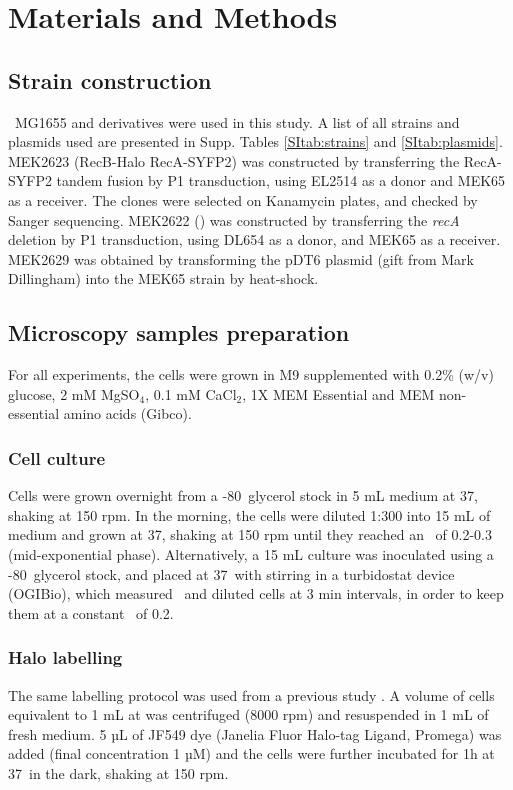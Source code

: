\section*{Materials and Methods}

\subsection*{Strain construction}
\ecoli\ MG1655 and derivatives were used in this study. A list of all strains and plasmids used are presented in Supp. Tables \ref{SItab:strains} and \ref{SItab:plasmids}.
MEK2623 (RecB-Halo RecA-SYFP2) was constructed by transferring the RecA-SYFP2 tandem fusion by P1 transduction, using EL2514 \cite{Wiktor2021} as a donor and MEK65 \cite{Lepore2019a} as a receiver. The clones were selected on Kanamycin plates, and checked by Sanger sequencing. MEK2622 (\dreca) was constructed by transferring the \emph{recA} deletion by P1 transduction, using DL654 as a donor, and MEK65 as a receiver. MEK2629 was obtained by transforming the pDT6 plasmid (gift from Mark Dillingham) into the MEK65 strain by heat-shock.

\subsection*{Microscopy samples preparation}
For all experiments, the cells were grown in M9 supplemented with 0.2\% (w/v) glucose, 2 mM MgSO$_4$, 0.1 mM CaCl$_2$, 1X MEM Essential and MEM non-essential amino acids (Gibco).
\subsubsection*{Cell culture}
Cells were grown overnight from a -80\celsius\ glycerol stock in 5 mL medium at 37\celsius, shaking at 150 rpm. In the morning, the cells were diluted 1:300 into 15 mL of medium and grown at 37\celsius, shaking at 150 rpm until they reached an \od\ of 0.2-0.3 (mid-exponential phase).
Alternatively, a 15 mL culture was inoculated using a -80\celsius\ glycerol stock, and placed at 37\celsius\ with stirring in a turbidostat device (OGIBio), which measured \od\ and diluted cells at 3 min intervals, in order to keep them at a constant \od\ of 0.2.
\subsubsection*{Halo labelling}
The same labelling protocol was used from a previous study \cite{Lepore2023}. A volume of cells equivalent to 1 mL at  was centrifuged (8000 rpm) and resuspended in 1 mL of fresh medium. 5 µL of JF549 dye (Janelia Fluor Halo-tag Ligand, Promega) was added (final concentration 1 µM) and the cells were further incubated for 1h at 37\celsius\ in the dark, shaking at 150 rpm.
